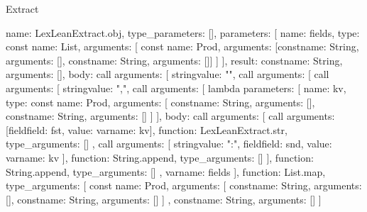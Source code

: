 \begin{lexlean}{Extract}
\begin{toolingmodule}
{{      name: LexLeanExtract.obj,
      type_parameters: [],
      parameters: [
        {
          name: fields,
          type: const{
            name: List,
            arguments: [
              const{
                name: Prod,
                arguments: [const{name: String, arguments: []}, const{name: String, arguments: []}]
              }
            ]
          }
        }
      ],
      result: const{name: String, arguments: []},
      body: call{
        arguments: [
          string{value: "{"},
          call{
            arguments: [
              call{
                arguments: [
                  string{value: ","},
                  call{
                    arguments: [
                      lambda{
                        parameters: [
                          {
                            name: kv,
                            type: const{
                              name: Prod,
                              arguments: [
                                const{name: String, arguments: []},
                                const{name: String, arguments: []}
                              ]
                            }
                          }
                        ],
                        body: call{
                          arguments: [
                            call{
                              arguments: [field{field: fst, value: var{name: kv}}],
                              function: LexLeanExtract.str,
                              type_arguments: []
                            },
                            call{
                              arguments: [
                                string{value: ":"},
                                field{field: snd, value: var{name: kv}}
                              ],
                              function: String.append,
                              type_arguments: []
                            }
                          ],
                          function: String.append,
                          type_arguments: []
                        }
                      },
                      var{name: fields}
                    ],
                    function: List.map,
                    type_arguments: [
                      const{
                        name: Prod,
                        arguments: [
                          const{name: String, arguments: []},
                          const{name: String, arguments: []}
                        ]
                      },
                      const{name: String, arguments: []}
                    ]
                  }
}}}}}}
\end{toolingmodule}
\end{lexlean}
